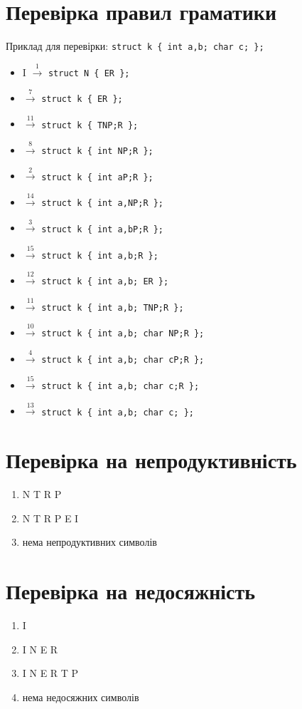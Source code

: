 \newpage
\section{Перевірка правил граматики}
Приклад для перевірки: \verb|struct k { int a,b; char c; };|
\begin{itemize}
    \item[]  I $\xrightarrow{1}$ \verb|struct N { ER };|
    \item[]  $\xrightarrow{7}$   \verb|struct k { ER };|
    \item[]  $\xrightarrow{11}$  \verb|struct k { TNP;R };|
    \item[]  $\xrightarrow{8}$   \verb|struct k { int NP;R };|
    \item[]  $\xrightarrow{2}$   \verb|struct k { int aP;R };|
    \item[]  $\xrightarrow{14}$  \verb|struct k { int a,NP;R };|
    \item[]  $\xrightarrow{3}$   \verb|struct k { int a,bP;R };|
    \item[]  $\xrightarrow{15}$  \verb|struct k { int a,b;R };|
    \item[]  $\xrightarrow{12}$  \verb|struct k { int a,b; ER };|
    \item[]  $\xrightarrow{11}$  \verb|struct k { int a,b; TNP;R };|
    \item[]  $\xrightarrow{10}$  \verb|struct k { int a,b; char NP;R };|
    \item[]  $\xrightarrow{4}$   \verb|struct k { int a,b; char cP;R };|
    \item[]  $\xrightarrow{15}$  \verb|struct k { int a,b; char c;R };|
    \item[]  $\xrightarrow{13}$  \verb|struct k { int a,b; char c; };|
\end{itemize}

\newpage
\section{Перевірка на непродуктивність}
\begin{enumerate}
    \item[]  N T R P
    \item[]  N T R P E I
    \item[]  нема непродуктивних символів
\end{enumerate}

\section{Перевірка на недосяжність}
\begin{enumerate}
    \item[]  I
    \item[]  I N E R
    \item[]  I N E R T P
    \item[]  нема недосяжних символів
\end{enumerate}


